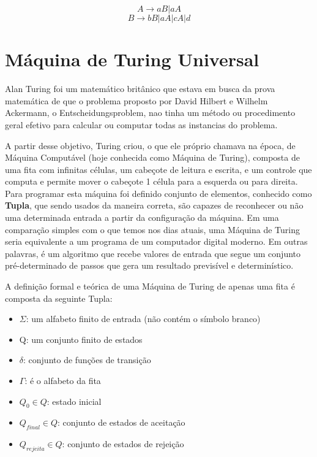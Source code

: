 \documentclass{article}
\begin{document}
                             \[A \longrightarrow aB | aA\] 
                            \[B \longrightarrow bB | aA | cA | d\]
                     
    
    
    
    

\section{Máquina de Turing Universal}

    Alan Turing foi um matemático britânico que estava em busca da prova matemática de que o problema proposto por David Hilbert e Wilhelm Ackermann, o Entscheidungsproblem, nao tinha um método ou procedimento geral efetivo para calcular ou computar todas as instancias do problema.
    
    A partir desse objetivo, Turing criou, o que ele próprio chamava na época, de Máquina Computável (hoje conhecida como Máquina de Turing), composta de uma fita com infinitas células, um cabeçote de leitura e escrita, e um controle que computa e permite mover o cabeçote 1 célula para a esquerda ou para direita. Para programar esta máquina foi definido conjunto de elementos, conhecido como \textbf{Tupla}, que sendo usados da maneira correta, são capazes de reconhecer ou não uma determinada entrada a partir da configuração da máquina. Em uma comparação simples com o que temos nos dias atuais, uma Máquina de Turing seria equivalente a um programa de um computador digital moderno. Em outras palavras, é um algoritmo que recebe valores de entrada que segue um conjunto pré-determinado de passos que gera um resultado previsível e determinístico. 
    
    A definição formal e teórica de uma Máquina de Turing de apenas uma fita é composta da seguinte Tupla:
    
    \begin{itemize}
        \item $\Sigma$: um alfabeto finito de entrada (não contém o símbolo branco)
        \item Q: um conjunto finito de estados
        \item $\delta$: conjunto de funções de transição
        \item $\Gamma$: é o alfabeto da fita
        \item $Q_0 \in Q$: estado inicial
        \item $Q_{final} \in Q $: conjunto de estados de aceitação
        \item $Q_{rejeita} \in Q $: conjunto de estados de rejeição
\end{itemize}
    
\end{document}
